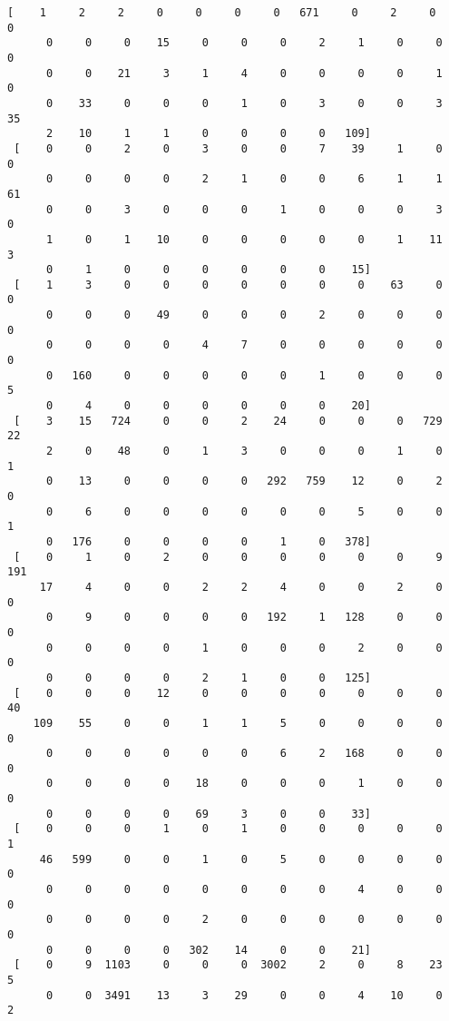 \documentclass[11pt]{article}
\begin{document}
\begin{Verbatim}[commandchars=\\\{\}]
 [    1     2     2     0     0     0     0   671     0     2     0     0
      0     0     0    15     0     0     0     2     1     0     0     0
      0     0    21     3     1     4     0     0     0     0     1     0
      0    33     0     0     0     1     0     3     0     0     3    35
      2    10     1     1     0     0     0     0   109]
 [    0     0     2     0     3     0     0     7    39     1     0     0
      0     0     0     0     2     1     0     0     6     1     1    61
      0     0     3     0     0     0     1     0     0     0     3     0
      1     0     1    10     0     0     0     0     0     1    11     3
      0     1     0     0     0     0     0     0    15]
 [    1     3     0     0     0     0     0     0     0    63     0     0
      0     0     0    49     0     0     0     2     0     0     0     0
      0     0     0     0     4     7     0     0     0     0     0     0
      0   160     0     0     0     0     0     1     0     0     0     5
      0     4     0     0     0     0     0     0    20]
 [    3    15   724     0     0     2    24     0     0     0   729    22
      2     0    48     0     1     3     0     0     0     1     0     1
      0    13     0     0     0     0   292   759    12     0     2     0
      0     6     0     0     0     0     0     0     5     0     0     1
      0   176     0     0     0     0     1     0   378]
 [    0     1     0     2     0     0     0     0     0     0     9   191
     17     4     0     0     2     2     4     0     0     2     0     0
      0     9     0     0     0     0   192     1   128     0     0     0
      0     0     0     0     1     0     0     0     2     0     0     0
      0     0     0     0     2     1     0     0   125]
 [    0     0     0    12     0     0     0     0     0     0     0    40
    109    55     0     0     1     1     5     0     0     0     0     0
      0     0     0     0     0     0     6     2   168     0     0     0
      0     0     0     0    18     0     0     0     1     0     0     0
      0     0     0     0    69     3     0     0    33]
 [    0     0     0     1     0     1     0     0     0     0     0     1
     46   599     0     0     1     0     5     0     0     0     0     0
      0     0     0     0     0     0     0     0     4     0     0     0
      0     0     0     0     2     0     0     0     0     0     0     0
      0     0     0     0   302    14     0     0    21]
 [    0     9  1103     0     0     0  3002     2     0     8    23     5
      0     0  3491    13     3    29     0     0     4    10     0     2

\end{Verbatim}
\end{document}
